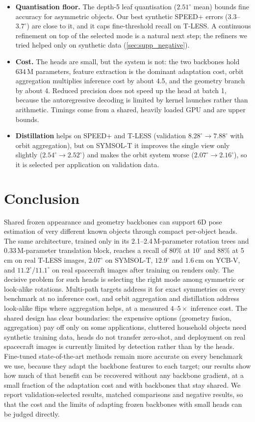 \begin{itemize}
\item \textbf{Quantisation floor.} The depth-5 leaf quantisation ($2.51^\circ$ mean) bounds fine accuracy for asymmetric objects. Our best synthetic SPEED+ errors ($3.3$--$3.7^\circ$) are close to it, and it caps fine-threshold recall on T-LESS. A continuous refinement on top of the selected mode is a natural next step; the refiners we tried helped only on synthetic data (\cref{sec:supp_negative}).
\item \textbf{Cost.} The heads are small, but the system is not: the two backbones hold 634\,M parameters, feature extraction is the dominant adaptation cost, orbit aggregation multiplies inference cost by about 4.5, and the geometry branch by about 4. Reduced precision does not speed up the head at batch 1, because the autoregressive decoding is limited by kernel launches rather than arithmetic. Timings come from a shared, heavily loaded GPU and are upper bounds.
\item \textbf{Distillation} helps on SPEED+ and T-LESS (validation $8.28^\circ\to7.88^\circ$ with orbit aggregation), but on SYMSOL-T it improves the single view only slightly ($2.54^\circ\to2.52^\circ$) and makes the orbit system worse ($2.07^\circ\to2.16^\circ$), so it is selected per application on validation data.
\end{itemize}

\section{Conclusion}
\label{sec:conclusion}
Shared frozen appearance and geometry backbones can support 6D pose estimation of very different known objects through compact per-object heads. The same architecture, trained only in its 2.1--2.4\,M-parameter rotation trees and 0.33\,M-parameter translation block, reaches a recall of 80\% at $10^\circ$ and 88\% at 5\,cm on real T-LESS images, $2.07^\circ$ on SYMSOL-T, $12.9^\circ$ and 1.6\,cm on YCB-V, and $11.2^\circ/11.1^\circ$ on real spacecraft images after training on renders only. The decisive problem for such heads is selecting the right mode among symmetric or look-alike rotations. Multi-path targets address it for exact symmetries on every benchmark at no inference cost, and orbit aggregation and distillation address look-alike flips where aggregation helps, at a measured $4\text{--}5\times$ inference cost. The shared design has clear boundaries: the expensive options (geometry fusion, aggregation) pay off only on some applications, cluttered household objects need synthetic training data, heads do not transfer zero-shot, and deployment on real spacecraft images is currently limited by detection rather than by the heads. Fine-tuned state-of-the-art methods remain more accurate on every benchmark we use, because they adapt the backbone features to each target; our results show how much of that benefit can be recovered without any backbone gradient, at a small fraction of the adaptation cost and with backbones that stay shared. We report validation-selected results, matched comparisons and negative results, so that the cost and the limits of adapting frozen backbones with small heads can be judged directly.
